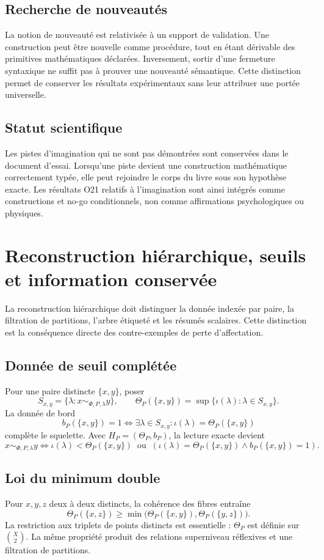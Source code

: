 \documentclass[11pt,a4paper,openany]{book}
\begin{document}
\section{Recherche de nouveautés}
La notion de nouveauté est relativisée à un support de validation. Une construction peut être nouvelle comme procédure, tout en étant dérivable des primitives mathématiques déclarées. Inversement, sortir d'une fermeture syntaxique ne suffit pas à prouver une nouveauté sémantique. Cette distinction permet de conserver les résultats expérimentaux sans leur attribuer une portée universelle.

\section{Statut scientifique}
Les pistes d'imagination qui ne sont pas démontrées sont conservées dans le document d'essai. Lorsqu'une piste devient une construction mathématique correctement typée, elle peut rejoindre le corps du livre sous son hypothèse exacte. Les résultats O21 relatifs à l'imagination sont ainsi intégrés comme constructions et no-go conditionnels, non comme affirmations psychologiques ou physiques.


\chapter{Reconstruction hiérarchique, seuils et information conservée}

La reconstruction hiérarchique doit distinguer la donnée indexée par paire, la filtration de partitions, l'arbre étiqueté et les résumés scalaires. Cette distinction est la conséquence directe des contre-exemples de perte d'affectation.

\section{Donnée de seuil complétée}
Pour une paire distincte $\{x,y\}$, poser
\[
S_{x,y}=\{\lambda:x\sim_{\Phi,P,\lambda}y\},
\qquad
\Theta_P(\{x,y\})=\sup\{\iota(\lambda):\lambda\in S_{x,y}\}.
\]
La donnée de bord
\[
b_P(\{x,y\})=1\iff\exists\lambda\in S_{x,y}:\iota(\lambda)=\Theta_P(\{x,y\})
\]
complète le squelette. Avec $H_P=(\Theta_P,b_P)$, la lecture exacte devient
\[
x\sim_{\Phi,P,\lambda}y
\iff
\iota(\lambda)<\Theta_P(\{x,y\})
\ \text{ ou }\
(\iota(\lambda)=\Theta_P(\{x,y\})\land b_P(\{x,y\})=1).
\]

\section{Loi du minimum double}
Pour $x,y,z$ deux à deux distincts, la cohérence des fibres entraîne
\[
\Theta_P(\{x,z\})\geq
\min\bigl(\Theta_P(\{x,y\}),\Theta_P(\{y,z\})\bigr).
\]
La restriction aux triplets de points distincts est essentielle : $\Theta_P$ est définie sur $\binom{X}{2}$. La même propriété produit des relations superniveau réflexives et une filtration de partitions.
\end{document}
